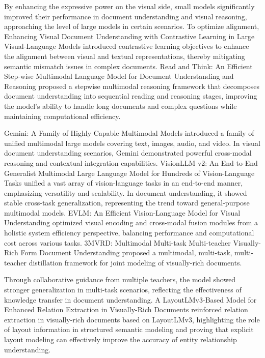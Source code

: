 By enhancing the expressive power on the visual side, small models significantly improved their performance in document understanding and visual reasoning, approaching the level of large models in certain scenarios. To optimize alignment, Enhancing Visual Document Understanding with Contrastive Learning in Large Visual-Language Models \cite{wu2024contrastivedoc} introduced contrastive learning objectives to enhance the alignment between visual and textual representations, thereby mitigating semantic mismatch issues in complex documents. Read and Think: An Efficient Step-wise Multimodal Language Model for Document Understanding and Reasoning \cite{lu2024readthink} proposed a stepwise multimodal reasoning framework that decomposes document understanding into sequential reading and reasoning stages, improving the model's ability to handle long documents and complex questions while maintaining computational efficiency.

Gemini: A Family of Highly Capable Multimodal Models \cite{team2023gemini} introduced a family of unified multimodal large models covering text, images, audio, and video. In visual document understanding scenarios, Gemini demonstrated powerful cross-modal reasoning and contextual integration capabilities. VisionLLM v2: An End-to-End Generalist Multimodal Large Language Model for Hundreds of Vision-Language Tasks \cite{wang2024visionllmv2} unified a vast array of vision-language tasks in an end-to-end manner, emphasizing versatility and scalability. In document understanding, it showed stable cross-task generalization, representing the trend toward general-purpose multimodal models. EVLM: An Efficient Vision-Language Model for Visual Understanding \cite{li2024evlm} optimized visual encoding and cross-modal fusion modules from a holistic system efficiency perspective, balancing performance and computational cost across various tasks.
3MVRD: Multimodal Multi-task Multi-teacher Visually-Rich Form Document Understanding \cite{zhang2024mmvrd} proposed a multimodal, multi-task, multi-teacher distillation framework for joint modeling of visually-rich documents.

Through collaborative guidance from multiple teachers, the model showed stronger generalization in multi-task scenarios, reflecting the effectiveness of knowledge transfer in document understanding. A LayoutLMv3-Based Model for Enhanced Relation Extraction in Visually-Rich Documents \cite{li2024layoutlmv3re} reinforced relation extraction in visually-rich documents based on LayoutLMv3, highlighting the role of layout information in structured semantic modeling and proving that explicit layout modeling can effectively improve the accuracy of entity relationship understanding.
